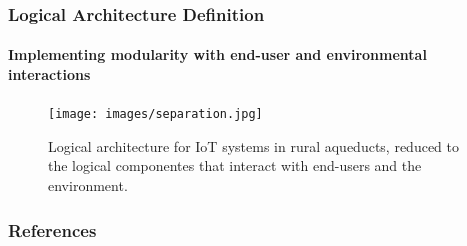 \documentclass{beamer}
\begin{document}
\begin{frame}
    \frametitle{\small Logical Architecture Definition}
    \framesubtitle{Implementing modularity with end-user and environmental interactions}

    \begin{figure}
        \centering
        \texttt{[image: images/separation.jpg]}
        \caption{Logical architecture for IoT systems in rural aqueducts, reduced to the logical componentes that interact with end-users and the environment.}
    \end{figure}
\end{frame}

\begin{frame}
    \frametitle{References}
    
    
\end{frame}
\end{document}

